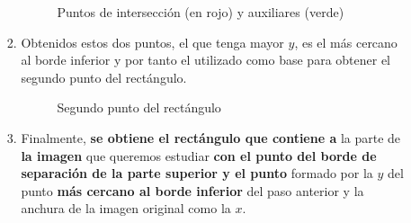 \begin{enumerate}
\begin{enumerate}[label*=\arabic*.]
\begin{enumerate}[label*=\arabic*.]
      \begin{figure}[H]
        \caption{Puntos de intersección (en rojo) y auxiliares
          (verde)}
        \centering \setlength\fboxsep{0pt} \setlength\fboxrule{0.5pt}
      \end{figure}

    \item Obtenidos estos dos puntos, el que tenga mayor $y$, es el
      más cercano al borde inferior y por tanto el utilizado como base
      para obtener el segundo punto del rectángulo.

      \begin{figure}[H]
        \caption{Segundo punto del rectángulo}
        \centering \setlength\fboxsep{0pt} \setlength\fboxrule{0.5pt}
      \end{figure}

    \item Finalmente, \textbf{se obtiene el rectángulo que contiene a}
      la parte de \textbf{la imagen} que queremos estudiar \textbf{con
        el punto del borde de separación de la parte superior y el
        punto} formado por la $y$ del punto \textbf{más cercano al
        borde inferior} del paso anterior y la anchura de la imagen
      original como la $x$.


\end{enumerate}
\end{enumerate}
\end{enumerate}
